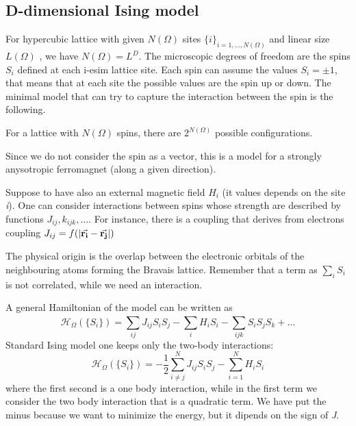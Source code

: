 \documentclass[../main/main.tex]{subfiles}
\begin{document}
\subsection{D-dimensional Ising model}
For hypercubic lattice with  given \( N(\Omega ) \) sites \( \{ i \}_{i=1,\dots,N(\Omega )}   \) and linear size \( L(\Omega ) \) , we have \( N (\Omega ) = L^D \). The microscopic degrees of freedom are the spins \( S_i \) defined at each i-esim lattice site. Each spin can assume the values  \( S_i = \pm 1 \), that means that at each site the possible values are the spin up or down. The minimal model that can try to capture the interaction between the spin is the following.

For a lattice with \( N(\Omega ) \) spins, there are \( 2^{N(\Omega )} \)  possible configurations.
\begin{remark}
Since we do not consider the spin as a vector, this is a model for a strongly anysotropic ferromagnet (along a given direction).
\end{remark}
Suppose to have also an external magnetic field \( H_i \) (it values depends on the site \emph{i}). One can consider interactions between spins whose strength are described by functions \( J_{ij},k_{ijk}, \dots \). For instance, there is a coupling that derives from electrons coupling \( J_{ij} = f ( \abs{\va{r_i}- \va{r_j}  } ) \)

The physical origin is the overlap between the electronic orbitals of the neighbouring atoms forming the Bravais lattice.
Remember that a term as \( \sum_{i}^{} S_i  \) is not correlated, while we need an interaction.

A general Hamiltonian of the model can be written as
\begin{equation}
  \mathcal{H}_ \Omega ( \{ S_i \}  ) = \sum_{ij}^{} J_{ij} S_i S_j - \sum_{i}^{} H_i S_i - \sum_{ijk}^{} S_i S_j S_k + \dots
\end{equation}
Standard Ising model one keeps only the two-body interactions:
\begin{equation}
  \mathcal{H}_ \Omega ( \{ S_i \}  ) = -\frac{1}{2}\sum_{i\neq j}^{N} J_{ij} S_i S_j - \sum_{i=1}^{N} H_i S_i
\end{equation}
where the first second is a one body interaction, while in the first term we consider the two body interaction that is a quadratic term. We have put the minus because we want to minimize the energy, but it dipends on the sign of  \emph{J}.
\end{document}
